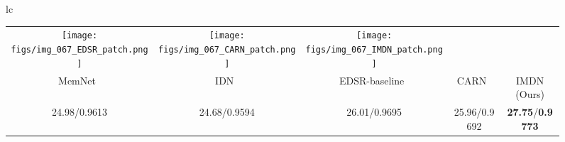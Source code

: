 \documentclass[sigconf]{acmart}
\begin{document}
\begin{figure*}[htpb]
{\begin{tabular}{lc}
\begin{adjustbox}{valign=t}
\begin{tabular}{ccccc}
					\hspace{-3mm}
					\texttt{[image: figs/img\_067\_EDSR\_patch.png]} &
					\hspace{-3mm}
					\texttt{[image: figs/img\_067\_CARN\_patch.png]} &
					\hspace{-3mm}
					\texttt{[image: figs/img\_067\_IMDN\_patch.png]} \\
					MemNet~\cite{MemNet} & \hspace{-3mm}
					IDN~\cite{IDN} & \hspace{-3mm}
					EDSR-baseline~\cite{EDSR} & \hspace{-3mm}
					CARN~\cite{CARN} & \hspace{-3mm}
					IMDN (Ours) \\
					24.98/0.9613 & \hspace{-3mm}
					24.68/0.9594 & \hspace{-3mm}
					26.01/0.9695 & \hspace{-3mm}
					25.96/0.9692 & \hspace{-3mm}
					\textbf{27.75}/\textbf{0.9773} \\
				\end{tabular}
			\end{adjustbox}
			\\
			

\end{tabular}}
\end{figure*}
\end{document}
